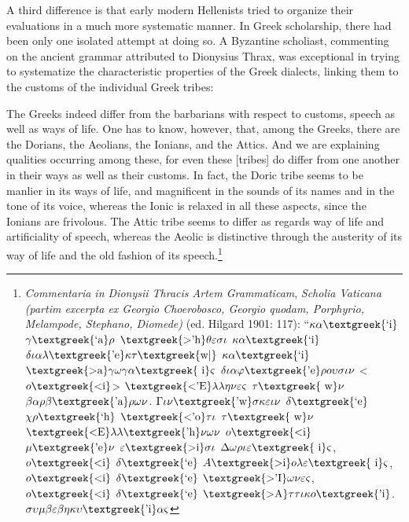 \documentclass[12pt]{article}
\newenvironment{styleStandard}{\renewcommand\baselinestretch{1.25}\setlength\leftskip{0in}\setlength\rightskip{0in}\setlength\parindent{0.1972in}\setlength\parfillskip{0pt plus 1fil}\setlength\parskip{0in plus 1pt}\writerlistparindent\writerlistleftskip\leavevmode\normalfont\normalsize\writerlistlabel\ignorespaces}{\unskip\vspace{0in plus 1pt}\par}
\newenvironment{styleQuote}{\renewcommand\baselinestretch{1.25}\setlength\leftskip{0.3937in}\setlength\rightskip{0in}\setlength\parindent{0in}\setlength\parfillskip{0pt plus 1fil}\setlength\parskip{0.1665in plus 0.016649999in}\writerlistparindent\writerlistleftskip\leavevmode\normalfont\normalsize\writerlistlabel\ignorespaces}{\unskip\vspace{0.1665in plus 0.016649999in}\par}
\newcommand\writerlistleftskip{}
\newcommand\writerlistparindent{}
\newcommand\writerlistlabel{}
\begin{document}
\begin{styleStandard}
A third difference is that early modern Hellenists tried to organize their evaluations in a much more systematic manner. In Greek scholarship, there had been only one isolated attempt at doing so. A Byzantine scholiast, commenting on the ancient grammar attributed to Dionysius Thrax, was exceptional in trying to systematize the characteristic properties of the Greek dialects, linking them to the customs of the individual Greek tribes:
\end{styleStandard}

\begin{styleQuote}
The Greeks indeed differ from the barbarians with respect to customs, speech as well as ways of life. One has to know, however, that, among the Greeks, there are the Dorians, the Aeolians, the Ionians, and the Attics. And we are explaining qualities occurring among these, for even these [tribes] do differ from one another in their ways as well as their customs. In fact, the Doric tribe seems to be manlier in its ways of life, and magnificent in the sounds of its names and in the tone of its voice, whereas the Ionic is relaxed in all these aspects, since the Ionians are frivolous. The Attic tribe seems to differ as regards way of life and artificiality of speech, whereas the Aeolic is distinctive through the austerity of its way of life and the old fashion of its speech.\footnote{ \textit{Commentaria in Dionysii Thracis Artem Grammaticam}, \textit{Scholia Vaticana (partim excerpta ex Georgio Choerobosco, Georgio quodam, Porphyrio, Melampode, Stephano, Diomede)} (ed. Hilgard 1901: 117): “$\kappa \alpha \text{\textgreek{`i}}$ $\gamma \text{\textgreek{`a}}\rho $ $\text{\textgreek{>'h}}\theta \varepsilon \sigma \iota $ $\kappa \alpha \text{\textgreek{`i}}$ $\delta \iota \alpha \lambda \text{\textgreek{'e}}\kappa \tau \text{\textgreek{w|}}$ $\kappa \alpha \text{\textgreek{`i}}$ $\text{\textgreek{>a}}\gamma \omega \gamma \alpha \text{\textgreek{~i}}\varsigma $ $\delta \iota \alpha \varphi \text{\textgreek{'e}}\rho o\upsilon \sigma \iota \nu $ {\textless}$o\text{\textgreek{<i}}${\textgreater} $\text{\textgreek{<'E}}\lambda \lambda \eta \nu \varepsilon \varsigma $ $\tau \text{\textgreek{~w}}\nu $ $\beta \alpha \rho \beta \text{\textgreek{'a}}\rho \omega \nu $. $\Gamma \iota \nu \text{\textgreek{'w}}\sigma \kappa \varepsilon \iota \nu $ $\delta \text{\textgreek{`e}}$ $\chi \rho \text{\textgreek{`h}}$ $\text{\textgreek{<'o}}\tau \iota $ $\tau \text{\textgreek{~w}}\nu $ $\text{\textgreek{<E}}\lambda \lambda \text{\textgreek{'h}}\nu \omega \nu $ $o\text{\textgreek{<i}}$ $\mu \text{\textgreek{'e}}\nu $ $\varepsilon \text{\textgreek{>i}}\sigma \iota $ $\Delta \omega \rho \iota \varepsilon \text{\textgreek{~i}}\varsigma $, $o\text{\textgreek{<i}}$ $\delta \text{\textgreek{`e}}$ $A\text{\textgreek{>i}}o\lambda \varepsilon \text{\textgreek{~i}}\varsigma $, $o\text{\textgreek{<i}}$ $\delta \text{\textgreek{`e}}$ $\text{\textgreek{>'I}}\omega \nu \varepsilon \varsigma $, $o\text{\textgreek{<i}}$ $\delta \text{\textgreek{`e}}$ $\text{\textgreek{>A}}\tau \tau \iota \kappa o\text{\textgreek{'i}}$. $\sigma \upsilon \mu \beta \varepsilon \beta \eta \kappa \upsilon \text{\textgreek{'i}}\alpha \varsigma $ 
\end{styleQuote}
\end{document}
